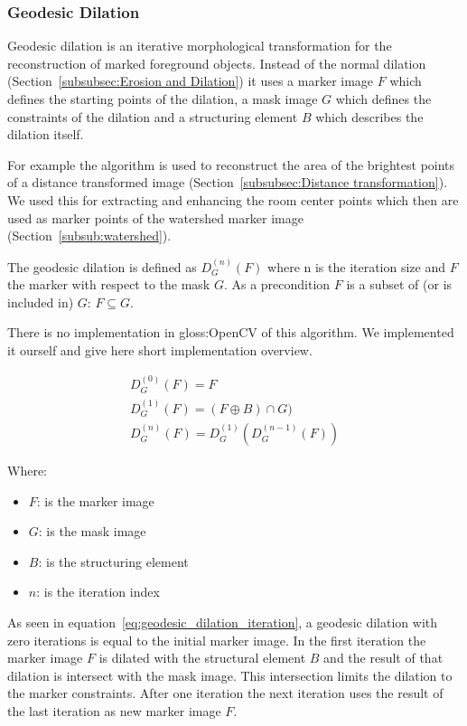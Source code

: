 \subsubsection{Geodesic Dilation}
\label{subsubsec:GeodesicDilation}

Geodesic dilation is an iterative morphological transformation for the reconstruction of marked foreground objects. Instead of the normal dilation (Section~\ref{subsubsec:Erosion and Dilation}) it uses a marker image $F$ which defines the starting points of the dilation, a mask image $G$ which defines the constraints of the dilation and a structuring element $B$ which describes the dilation itself.

For example the algorithm is used to reconstruct the area of the brightest points of a distance transformed image (Section~\ref{subsubsec:Distance transformation}). We used this for extracting and enhancing the room center points which then are used as marker points of the watershed marker image (Section~\ref{subsub:watershed}).

The geodesic dilation is defined as $D_{G}^{(n)}(F)$ where n is the iteration size and $F$ the marker with respect to the mask $G$. As a precondition $F$ is a subset of (or is included in) $G$: $F \subseteq G$.

There is no implementation in \gls{gloss:OpenCV} of this algorithm. We implemented it ourself and give here short implementation overview.
	
\begin{equation} \label{eq:geodesic_dilation_iteration}
\begin{gathered}
D_{G}^{(0)}(F) = F
\\
D_{G}^{(1)}(F) = (F \oplus B) \cap G)
\\
D_{G}^{(n)}(F) = D_{G}^{(1)}(D_{G}^{(n-1)}(F))
\end{gathered}
\end{equation}

Where:
\begin{itemize}[label=]
    \item $F$: is the marker image
    \item $G$: is the mask image
    \item $B$: is the structuring element
    \item $n$: is the iteration index
\end{itemize}

As seen in equation~\eqref{eq:geodesic_dilation_iteration}, a geodesic dilation with zero iterations is equal to the initial marker image. In the first iteration the marker image $F$ is dilated with the structural element $B$ and the result of that dilation is intersect with the mask image. This intersection limits the dilation to the marker constraints. After one iteration the next iteration uses the result of the last iteration as new marker image $F$.

